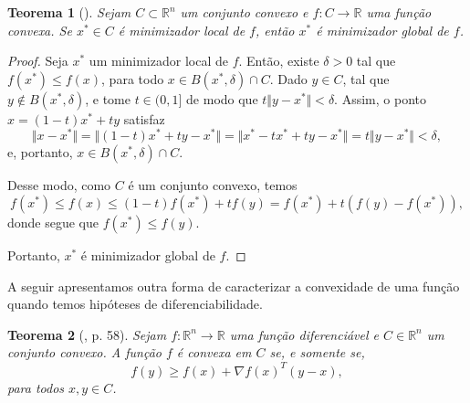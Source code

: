 \documentclass[12pt,a4paper]{scrartcl}
\def\RR{\mathds{R}}
\newtheorem{teo}{Teorema}
\theoremstyle{definition}%
\begin{document}
\begin{teo}[{\cite[p. 57]{Ademir2013}}]
Sejam $C \subset \RR^{n}$ um conjunto convexo e $f:C \rightarrow \RR$ uma função convexa. Se $x^{*} \in C$ é minimizador local de $f$, então $x^{*}$ é minimizador global de $f$.
\end{teo}
\begin{proof}
Seja $x^{*}$ um minimizador local de $f$. Então, existe $\delta > 0$ tal que $f(x^{*}) \leq f(x)$, para todo $x \in B(x^{*}, \delta) \cap C$. Dado $y \in C$, tal que $y \notin B(x^{*}, \delta)$, e tome $t \in (0,1]$ de modo que $t \Vert y-x^{*} \Vert < \delta$. Assim, o ponto $x = (1-t)x^{*} + ty$ satisfaz
\[
\Vert x - x^{*} \Vert = \Vert (1-t)x^{*} + ty - x^{*} \Vert = \Vert x^{*} - tx^{*} + ty - x^{*} \Vert = t \Vert y - x^{*} \Vert < \delta ,
\]
e, portanto, $x \in B(x^{*}, \delta) \cap C$.

Desse modo, como $C$ é um conjunto convexo, temos
\[
f(x^{*}) \leq f(x) \leq (1-t)f(x^{*}) + tf(y) = f(x^{*}) + t(f(y)-f(x^{*})),
\]
donde segue que $f(x^{*}) \leq f(y)$.

Portanto, $x^{*}$ é minimizador global de $f$.
\end{proof}

A seguir apresentamos outra forma de caracterizar a convexidade de uma função quando temos hipóteses de diferenciabilidade.

\begin{teo} [\textcite{Ademir2013}, p. 58] \label{teo:diferenciabilidade_e_convexidade}
Sejam $f: \RR^{n} \rightarrow \RR $ uma função diferenciável e $C \in \RR^{n}$ um conjunto convexo. A função $f$ é convexa em $C$ se, e somente se, 
\[
f(y) \geq f(x) + \nabla f(x)^{T}(y-x),
\]
para todos $x, y \in C$.
\end{teo}
\end{document}
